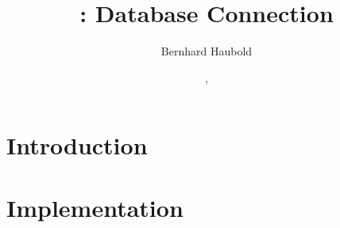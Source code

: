 \documentclass[a4paper]{report}
\begin{document}
\pagestyle{noweb}

\title{: Database Connection\\\scriptsize {}}
\author{Bernhard Haubold}
\date{\hspace{-3pt}, }
\maketitle

\tableofcontents

\chapter{Introduction}

\chapter{Implementation}

\end{document}

